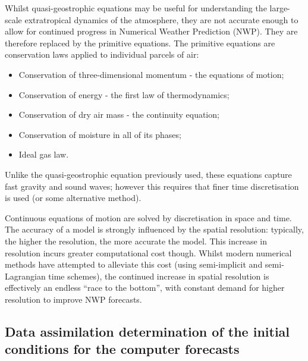 Whilst quasi-geostrophic equations may be useful for understanding the large-scale extratropical dynamics of the atmosphere, they are not accurate enough to allow for continued progress in Numerical Weather Prediction (NWP).
They are therefore replaced by the primitive equations.
The primitive equations are conservation laws applied to individual parcels of air:
\begin{itemize}
\item Conservation of three-dimensional momentum - the equations of motion;
\item Conservation of energy - the first law of thermodynamics;
\item Conservation of dry air mass - the continuity equation;
\item Conservation of moisture in all of its phases;
\item Ideal gas law.
\end{itemize}
Unlike the quasi-geostrophic equation previously used, these equations capture fast gravity and sound waves; however this requires that finer time discretisation is used (or some alternative method).

Continuous equations of motion are solved by discretisation in space and time.
The accuracy of a model is strongly influenced by the spatial resolution: typically, the higher the resolution, the more accurate the model.
This increase in resolution incurs greater computational cost though.
Whilst modern numerical methods have attempted to alleviate this cost (using semi-implicit and semi-Lagrangian time schemes), the continued increase in spatial resolution is effectively an endless ``race to the bottom'', with constant demand for higher resolution to improve NWP forecasts.

\subsection{Data assimilation determination of the initial conditions for the computer forecasts}
\label{subs:historical_overview:assimilation}

